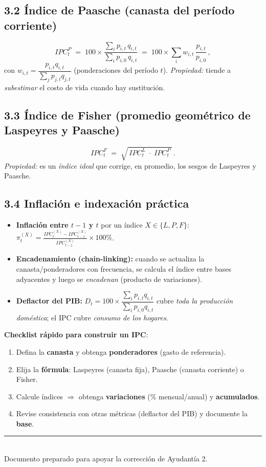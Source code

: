 \documentclass[11pt,addpoints]{article}
\begin{document}
\subsection*{3.2 Índice de Paasche (canasta del período corriente)}
\begin{equation*}
IPC_t^{P} \;=\; 100 \times \frac{\sum_i p_{i,t}\,q_{i,t}}{\sum_i p_{i,0}\,q_{i,t}}
\;=\; 100 \times \sum_i w_{i,t}\,\frac{p_{i,t}}{p_{i,0}}\,,
\end{equation*}
con \(w_{i,t}=\dfrac{p_{i,t}q_{i,t}}{\sum_j p_{j,t}q_{j,t}}\) (ponderaciones del período \(t\)).
\textit{Propiedad:} tiende a \emph{subestimar} el costo de vida cuando hay sustitución.

\subsection*{3.3 Índice de Fisher (promedio geométrico de Laspeyres y Paasche)}
\begin{equation*}
IPC_t^{F} \;=\; \sqrt{\,IPC_t^{L}\;\cdot\;IPC_t^{P}\,}\,.
\end{equation*}
\textit{Propiedad:} es un \emph{índice ideal} que corrige, en promedio, los sesgos de Laspeyres y Paasche.
\newpage %
\vspace*{0.1cm} %
\subsection*{3.4 Inflación e indexación práctica}
\begin{itemize}
  \item \textbf{Inflación entre \(t{-}1\) y \(t\)} por un índice \(X\in\{L,P,F\}\): 
  \(\displaystyle \pi_t^{(X)} = \frac{IPC_t^{(X)}-IPC_{t-1}^{(X)}}{IPC_{t-1}^{(X)}}\times 100\%\).
  \item \textbf{Encadenamiento (chain-linking):} cuando se actualiza la canasta/ponderadores con frecuencia, se calcula el índice entre bases adyacentes y luego se \emph{encadenan} (producto de variaciones).
  \item \textbf{Deflactor del PIB:} \(D_t=100\times\dfrac{\sum_i p_{i,t}q_{i,t}}{\sum_i p_{i,0}q_{i,t}}\) cubre \emph{toda la producción doméstica}; el IPC cubre \emph{consumo de los hogares}.
\end{itemize}

\bigskip
\textbf{Checklist rápido para construir un IPC}:
\begin{enumerate}[leftmargin=*]
  \item Defina la \textbf{canasta} y obtenga \textbf{ponderadores} (gasto de referencia).
  \item Elija la \textbf{fórmula}: Laspeyres (canasta fija), Paasche (canasta corriente) o Fisher.
  \item Calcule índices \(\Rightarrow\) obtenga \textbf{variaciones} (\% mensual/anual) y \textbf{acumulados}.
  \item Revise consistencia con otras métricas (deflactor del PIB) y documente la \textbf{base}.
\end{enumerate}

\vspace{3mm}
\noindent\rule{\linewidth}{0.4pt}\\[-2mm]
{\footnotesize Documento preparado para apoyar la corrección de Ayudantía 2.}
\end{document}
